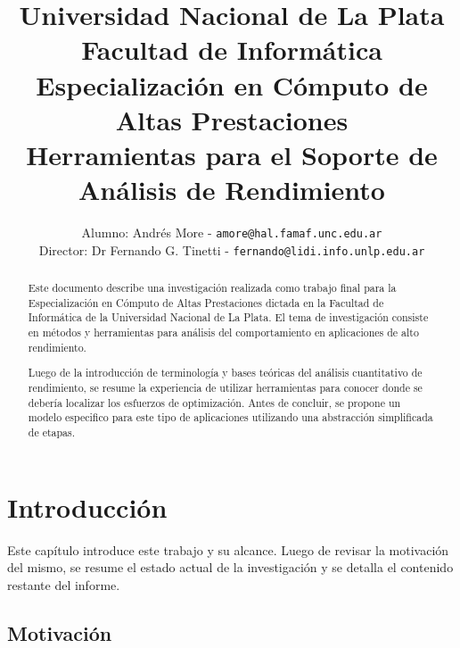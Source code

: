\documentclass[a4paper]{report}
\begin{document}
\title{
  Universidad Nacional de La Plata\\Facultad de Inform\'atica\\
  \bigskip
  Especializaci\'on en C\'omputo de Altas Prestaciones\\
  \bigskip
  Herramientas para el Soporte de An\'alisis de Rendimiento
}

\author{
  Alumno: Andr\'es More - {\tt amore@hal.famaf.unc.edu.ar}\\
  Director: Dr Fernando G. Tinetti - {\tt fernando@lidi.info.unlp.edu.ar}
}


\maketitle

\begin{abstract}

  \bigskip

  Este documento describe una investigaci\'on realizada como trabajo final para
  la Especializaci\'on en C\'omputo de Altas Prestaciones dictada en la Facultad
  de Inform\'atica de la Universidad Nacional de La Plata.
  El tema de investigaci\'on consiste en m\'etodos y herramientas para an\'alisis del comportamiento
 en aplicaciones de alto rendimiento.

  \bigskip

  Luego de la introducci\'on de terminolog\'ia y bases te\'oricas del an\'alisis cuantitativo
  de rendimiento, se resume la experiencia de utilizar herramientas para conocer donde
 se deber\'ia localizar los esfuerzos de optimizaci\'on.
  Antes de concluir, se propone un modelo especifico para este tipo de aplicaciones utilizando una abstracci\'on
  simplificada de etapas.

\end{abstract}

\tableofcontents

\chapter{Introducci\'on}

Este cap\'itulo introduce este trabajo y su alcance. Luego de revisar la motivaci\'on del mismo,
se resume el estado actual de la investigaci\'on y se detalla el contenido restante
del informe.

\section{Motivaci\'on}
\end{document}
